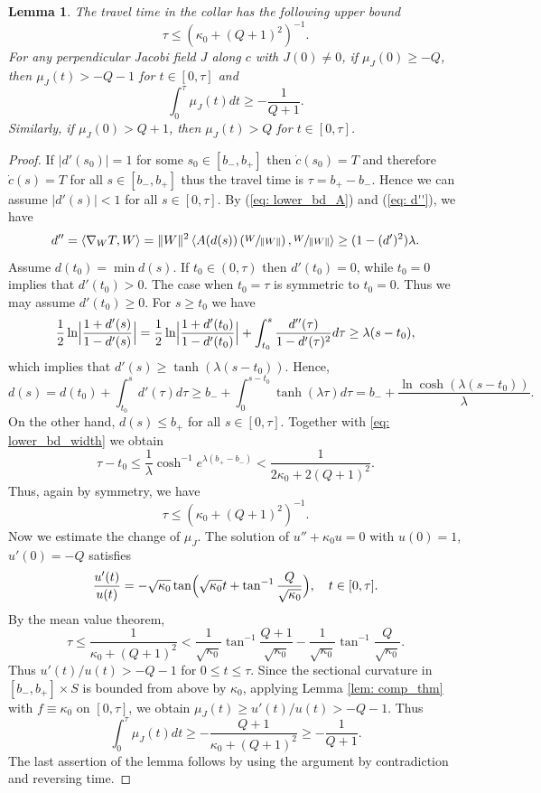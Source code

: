 \documentclass[JEP,XML,SOM,Unicode,NoFloatCountersInSection]{cedram}
\newtheorem{lemma}[theorem]{Lemma}
\theoremstyle{definition}
\renewcommand{\>}{{\rangle}}
\newcommand{\<}{{\langle}}
\begin{document}
\begin{lemma}\label{lem: bdd_trav_time}
The travel time in the collar has the following upper bound
\[
\tau\leq(\kappa_0+(Q+1)^2)^{-1}.
\]
For any perpendicular Jacobi field $J$ along $c$ with $J(0)\neq 0$, if $\mu_J(0)\geq -Q$, then $\mu_J(t)>-Q-1$ for $t\in [0,\tau]$ and
\[
\int_0^\tau \mu_J(t)dt\geq -\frac{1}{Q+1}.
\]
Similarly, if $\mu_J(0)>Q+1$, then $\mu_J(t)>Q$ for $t\in [0,\tau]$.
\end{lemma}
\begin{proof}
If $|d'(s_0)|=1$ for some $s_0\in [b_-, b_+]$ then $\dot c(s_0)=T$ and therefore $\dot{c}(s)=T$ for all $s\in [b_-, b_+]$ thus the travel time is $\tau=b_+-b_-$. Hence we can assume $|d'(s)|<1$ for all $s\in [0,\tau]$. By (\ref{eq: lower_bd_A}) and (\ref{eq: d''}), we have
\[
d''=\langle \nabla_W T, W\rangle=\|W\|^2\left\langle A(d(s))\left(\sfrac{W}{\|W\|}\right), \sfrac{W}{\|W\|}\right\rangle\geq (1-(d')^2)\lambda.
\]
Assume $d(t_0)=\min d(s)$. If $t_0\in(0,\tau)$ then $d'(t_0)=0$, while $t_0=0$ implies that $d'(t_0)>0$. The case when $t_0=\tau$ is symmetric to $t_0=0$. Thus we may assume $d'(t_0)\geq 0$. For $s\geq t_0$ we have
\[
\frac{1}{2}\ln\Bigl|\frac{1+d'(s)}{1-d'(s)}\Bigr|=\frac{1}{2}\ln\Bigl|\frac{1+d'(t_0)}{1-d'(t_0)}\Bigr|+\int_{t_0}^s \frac{d''(\tau)}{1-d'(\tau)^2}d\tau\geq\lambda (s-t_0),
\]
which implies that $d'(s)\geq \tanh(\lambda (s-t_0))$. Hence,
\[
d(s)=d(t_0)+\int_{t_0}^sd'(\tau)d\tau \geq b_-+\int_{0}^{s-t_0}\tanh(\lambda\tau)d\tau=b_-+\frac{\ln\cosh(\lambda (s-t_0))}{\lambda}.
\]
On the other hand, $d(s)\leq b_+$ for all $s\in [0,\tau]$. Together with \eqref{eq: lower_bd_width} we obtain
\[
\tau-t_0\leq \frac{1}{\lambda}\cosh^{-1}e^{\lambda(b_+-b_-)}<\frac{1}{2\kappa_0+2(Q+1)^2}.
\]
Thus, again by symmetry, we have
\[
\tau\leq(\kappa_0+(Q+1)^2)^{-1}.
\]
Now we estimate the change of $\mu_J$. The solution of $u''+\kappa_0u=0$ with $u(0)=1$, $u'(0)=-Q$ satisfies
\[
\frac{u'(t)}{u(t)}=-\sqrt{\kappa_0}\tan\Bigl(\sqrt{\kappa_0}t+\tan^{-1}\frac{Q}{\sqrt{\kappa_0}}\Bigr), \quad t\in [0,\tau].
\]
By the mean value theorem,
\[
\tau\leq \frac{1}{\kappa_0+(Q+1)^2}<\frac{1}{\sqrt{\kappa_0}}\tan^{-1}\frac{Q+1}{\sqrt{\kappa_0}}-\frac{1}{\sqrt{\kappa_0}}\tan^{-1}\frac{Q}{\sqrt{\kappa_0}}.
\]
Thus $u'(t)/u(t)>-Q-1$ for $0\leq t\leq \tau$. Since the sectional curvature in $[b_-, b_+] \times S$ is bounded from above by $\kappa_0$, applying Lemma \ref{lem: comp_thm} with $f\equiv \kappa_0$ on $[0,\tau]$, we obtain $\mu_J(t)\geq u'(t)/u(t)>-Q-1$. Thus
\[
\int_0^\tau \mu_J(t)dt\geq -\frac{Q+1}{\kappa_0+(Q+1)^2}\geq -\frac{1}{Q+1}.
\]
The last assertion of the lemma follows by using the argument by contradiction and reversing time.
\end{proof}
\end{document}
